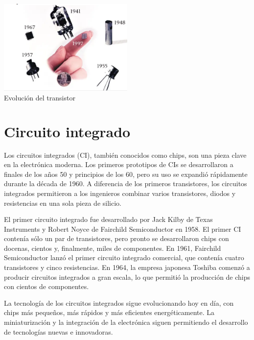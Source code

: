 \documentclass{article}
\begin{document}
\begin{center}
    \includegraphics[width=0.5\textwidth]{res/evol_transistor.png}\\
    Evolución del transistor
\end{center}



\section*{Circuito integrado}

Los circuitos integrados (CI), también conocidos como chips, son una pieza clave en la electrónica moderna. 
Los primeros prototipos de CIs se desarrollaron a finales de los años 50 y principios de los 60, 
pero su uso se expandió rápidamente durante la década de 1960. A diferencia de los primeros transistores, 
los circuitos integrados permitieron a los ingenieros combinar varios transistores, diodos y resistencias 
en una sola pieza de silicio.

El primer circuito integrado fue desarrollado por Jack Kilby de Texas Instruments 
y Robert Noyce de Fairchild Semiconductor en 1958. El primer CI contenía sólo un par de transistores, 
pero pronto se desarrollaron chips con docenas, cientos y, finalmente, miles de componentes. 
En 1961, Fairchild Semiconductor lanzó el primer circuito integrado comercial, que contenía 
cuatro transistores y cinco resistencias. En 1964, la empresa japonesa Toshiba comenzó a 
producir circuitos integrados a gran escala, lo que permitió la producción de chips con 
cientos de componentes.\cite{sze1981physics}

La tecnología de los circuitos integrados sigue evolucionando hoy en día, con chips más pequeños, más rápidos 
y más eficientes energéticamente. La miniaturización y la integración de la electrónica siguen permitiendo 
el desarrollo de tecnologías nuevas e innovadoras.
\end{document}
